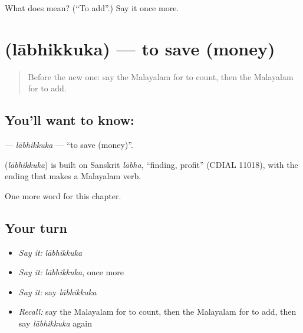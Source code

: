 \begin{tcolorbox}[breakable,colback=teal!4,colframe=teal!35!black,title={Before you move on}]
What does  mean? (\textquotedblleft{}To add\textquotedblright{}.) Say it once more.
\end{tcolorbox}
\section[\texorpdfstring{\ml{ലാഭിക്കുക} (lābhikkuka)}{ലാഭിക്കുക (lābhikkuka)}]{ (lābhikkuka) — to save (money)}

\label{lesson:ML-C303-labhikkuka}



\begin{quote}
Before the new one: say the Malayalam for to count, then the Malayalam for to add.
\end{quote}

\subsection*{You'll want to know: }
\textbf{} — \emph{lābhikkuka} — \textquotedblleft{}to save (money)\textquotedblright{}.

\begin{cousinweb}
\textbf{} (\emph{lābhikkuka}) is built on Sanskrit \emph{lābha}, \textquotedblleft{}finding, profit\textquotedblright{} (CDIAL 11018), with the ending that makes a Malayalam verb.
\end{cousinweb}

\begin{grammarlens}[title={What you've built}]
One more word for this chapter.
\end{grammarlens}

\subsection*{Your turn}
\begin{itemize}
\raggedright
  \item \emph{Say it:} \emph{lābhikkuka}
  \item \emph{Say it:} \emph{lābhikkuka}, once more
  \item \emph{Say it:} say \emph{lābhikkuka}
  \item \emph{Recall:} say the Malayalam for to count, then the Malayalam for to add, then say \emph{lābhikkuka} again
\end{itemize}

